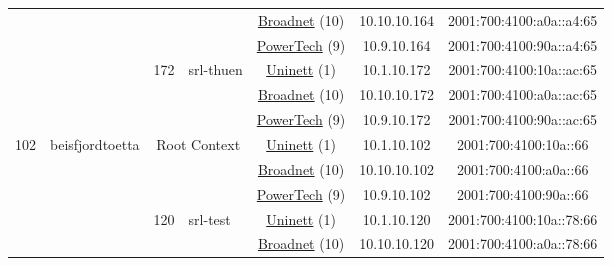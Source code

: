 \begin{small}
\begin{center}
\begin{longtable}{|c|c|c|c|c|c|c|c|}
  &  &  &  & \multicolumn{2}{|c|}{\tiny{\href{https://www.broadnet.no}{Broadnet} (10)}} & \tiny{10.10.10.164} & \tiny{2001:700:4100:a0a::a4:65} \\* \cline{5-5}\cline{6-6}\cline{7-7}\cline{8-8}
  &  &  &  & \multicolumn{2}{|c|}{\tiny{\href{http://www.powertech.no}{PowerTech} (9)}} & \tiny{10.9.10.164} & \tiny{2001:700:4100:90a::a4:65} \\* \cline{3-3}\cline{4-4}\cline{5-5}\cline{6-6}\cline{7-7}\cline{8-8}
  &  & \multirow{3}{*}{\tiny{172}} & \multicolumn{1}{|l|}{\multirow{3}{*}{\tiny{srl-thuen}}} & \multicolumn{2}{|c|}{\tiny{\href{https://www.uninett.no}{Uninett} (1)}} & \tiny{10.1.10.172} & \tiny{2001:700:4100:10a::ac:65} \\* \cline{5-5}\cline{6-6}\cline{7-7}\cline{8-8}
  &  &  &  & \multicolumn{2}{|c|}{\tiny{\href{https://www.broadnet.no}{Broadnet} (10)}} & \tiny{10.10.10.172} & \tiny{2001:700:4100:a0a::ac:65} \\* \cline{5-5}\cline{6-6}\cline{7-7}\cline{8-8}
  &  &  &  & \multicolumn{2}{|c|}{\tiny{\href{http://www.powertech.no}{PowerTech} (9)}} & \tiny{10.9.10.172} & \tiny{2001:700:4100:90a::ac:65} \\ \hline
 \multirow{36}{*}{\tiny{102}} & \multicolumn{1}{|l|}{\multirow{36}{*}{\tiny{beisfjordtoetta}}} & \multicolumn{2}{|c|}{\multirow{3}{*}{\tiny{Root Context}}} & \multicolumn{2}{|c|}{\tiny{\href{https://www.uninett.no}{Uninett} (1)}} & \tiny{10.1.10.102} & \tiny{2001:700:4100:10a::66} \\* \cline{5-5}\cline{6-6}\cline{7-7}\cline{8-8}
  &  & \multicolumn{2}{|c|}{} & \multicolumn{2}{|c|}{\tiny{\href{https://www.broadnet.no}{Broadnet} (10)}} & \tiny{10.10.10.102} & \tiny{2001:700:4100:a0a::66} \\* \cline{5-5}\cline{6-6}\cline{7-7}\cline{8-8}
  &  & \multicolumn{2}{|c|}{} & \multicolumn{2}{|c|}{\tiny{\href{http://www.powertech.no}{PowerTech} (9)}} & \tiny{10.9.10.102} & \tiny{2001:700:4100:90a::66} \\* \cline{3-3}\cline{4-4}\cline{5-5}\cline{6-6}\cline{7-7}\cline{8-8}
  &  & \multirow{3}{*}{\tiny{120}} & \multicolumn{1}{|l|}{\multirow{3}{*}{\tiny{srl-test}}} & \multicolumn{2}{|c|}{\tiny{\href{https://www.uninett.no}{Uninett} (1)}} & \tiny{10.1.10.120} & \tiny{2001:700:4100:10a::78:66} \\* \cline{5-5}\cline{6-6}\cline{7-7}\cline{8-8}
  &  &  &  & \multicolumn{2}{|c|}{\tiny{\href{https://www.broadnet.no}{Broadnet} (10)}} & \tiny{10.10.10.120} & \tiny{2001:700:4100:a0a::78:66} \\* \cline{5-5}\cline{6-6}\cline{7-7}\cline{8-8}

\end{longtable}
\end{center}
\end{small}
